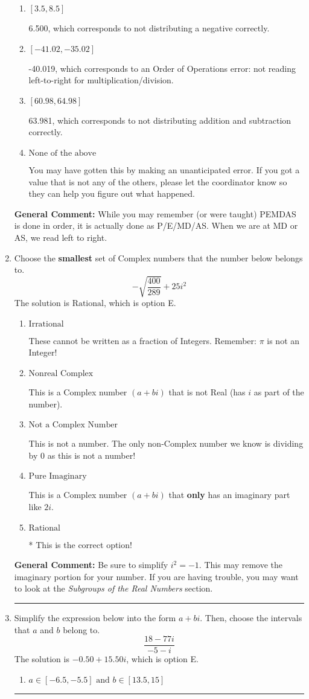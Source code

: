 \documentclass{extbook}[14pt]
\newcommand{\litem}[1]{\item #1

\rule{\textwidth}{0.4pt}}
\begin{document}
\begin{enumerate}
{\begin{enumerate}[label=\Alph*.]
* -47.500, which is the correct option.
\item \( [3.5, 8.5] \)

 6.500, which corresponds to not distributing a negative correctly.
\item \( [-41.02, -35.02] \)

 -40.019, which corresponds to an Order of Operations error: not reading left-to-right for multiplication/division.
\item \( [60.98, 64.98] \)

 63.981, which corresponds to not distributing addition and subtraction correctly.
\item \( \text{None of the above} \)

 You may have gotten this by making an unanticipated error. If you got a value that is not any of the others, please let the coordinator know so they can help you figure out what happened.
\end{enumerate}

\textbf{General Comment:} While you may remember (or were taught) PEMDAS is done in order, it is actually done as P/E/MD/AS. When we are at MD or AS, we read left to right.
}
\litem{
Choose the \textbf{smallest} set of Complex numbers that the number below belongs to.
\[ -\sqrt{\frac{400}{289}} + 25i^2 \]The solution is \( \text{Rational} \), which is option E.\begin{enumerate}[label=\Alph*.]
\item \( \text{Irrational} \)

These cannot be written as a fraction of Integers. Remember: $\pi$ is not an Integer!
\item \( \text{Nonreal Complex} \)

This is a Complex number $(a+bi)$ that is not Real (has $i$ as part of the number).
\item \( \text{Not a Complex Number} \)

This is not a number. The only non-Complex number we know is dividing by 0 as this is not a number!
\item \( \text{Pure Imaginary} \)

This is a Complex number $(a+bi)$ that \textbf{only} has an imaginary part like $2i$.
\item \( \text{Rational} \)

* This is the correct option!
\end{enumerate}

\textbf{General Comment:} Be sure to simplify $i^2 = -1$. This may remove the imaginary portion for your number. If you are having trouble, you may want to look at the \textit{Subgroups of the Real Numbers} section.
}
\litem{
Simplify the expression below into the form $a+bi$. Then, choose the intervals that $a$ and $b$ belong to.
\[ \frac{18 - 77 i}{-5 - i} \]The solution is \( -0.50  + 15.50 i \), which is option E.\begin{enumerate}[label=\Alph*.]
\item \( a \in [-6.5, -5.5] \text{ and } b \in [13.5, 15] \)


\end{enumerate}}
\end{enumerate}
\end{document}
